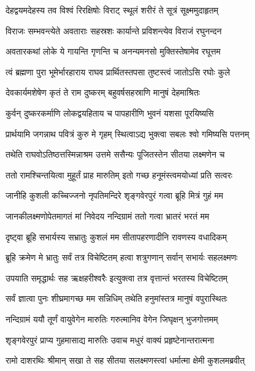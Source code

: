 \twolineshloka
{देहद्वयमदेहस्य तव विश्वं रिरक्षिषोः}
{विराट् स्थूलं शरीरं ते सूत्रं सूक्ष्ममुदाहृतम्} %

\twolineshloka
{विराजः सम्भवन्त्येते अवताराः सहस्रशः}
{कार्यान्ते प्रविशन्त्येव विराजं रघुनन्दन} %

\twolineshloka
{अवतारकथां लोके ये गायन्ति गृणन्ति च}
{अनन्यमनसो मुक्तिस्तेषामेव रघूत्तम} %

\twolineshloka
{त्वं ब्रह्मणा पुरा भूमेर्भारहाराय राघव}
{प्रार्थितस्तपसा तुष्टस्त्वं जातोऽसि रघोः कुले} %

\twolineshloka
{देवकार्यमशेषेण कृतं ते राम दुष्करम्}
{बहुवर्षसहस्राणि मानुषं देहमाश्रितः} %

\twolineshloka
{कुर्वन् दुष्करकर्माणि लोकद्वयहिताय च}
{पापहारीणि भुवनं यशसा पूरयिष्यसि} %

\twolineshloka
{प्रार्थयामि जगन्नाथ पवित्रं कुरु मे गृहम्}
{स्थित्वाऽद्य भुक्त्वा सबलः श्वो गमिष्यसि पत्तनम्} %

\twolineshloka
{तथेति राघवोऽतिष्ठत्तस्मिन्नाश्रम उत्तमे}
{ससैन्यः पूजितस्तेन सीतया लक्ष्मणेन च} %

\twolineshloka
{ततो रामश्चिन्तयित्वा मुहूर्तं प्राह मारुतिम्}
{इतो गच्छ हनूमंस्त्वमयोध्यां प्रति सत्वरः} %

\twolineshloka
{जानीहि कुशली कच्चिज्जनो नृपतिमन्दिरे}
{शृङ्गवेरपुरं गत्वा ब्रूहि मित्रं गुहं मम} %

\twolineshloka
{जानकीलक्ष्मणोपेतमागतं मां निवेदय}
{नन्दिग्रामं ततो गत्वा भ्रातरं भरतं मम} %

\twolineshloka
{दृष्ट्वा ब्रूहि सभार्यस्य सभ्रातुः कुशलं मम}
{सीतापहरणादीनि रावणस्य वधादिकम्} %

\twolineshloka
{ब्रूहि क्रमेण मे भ्रातुः सर्वं तत्र विचेष्टितम्}
{हत्वा शत्रुगणान् सर्वान् सभार्यः सहलक्ष्मणः} %

\twolineshloka
{उपयाति समृद्धार्थः सह ऋक्षहरीश्वरैः}
{इत्युक्त्वा तत्र वृत्तान्तं भरतस्य विचेष्टितम्} %

\twolineshloka
{सर्वं ज्ञात्वा पुनः शीघ्रमागच्छ मम सन्निधिम्}
{तथेति हनुमांस्तत्र मानुषं वपुरास्थितः} %

\twolineshloka
{नन्दिग्रामं ययौ तूर्णं वायुवेगेन मारुतिः}
{गरुत्मानिव वेगेन जिघृक्षन् भुजगोत्तमम्} %

\twolineshloka
{शृङ्गवेरपुरं प्राप्य गुहमासाद्य मारुतिः}
{उवाच मधुरं वाक्यं प्रहृष्टेनान्तरात्मना} %

\twolineshloka
{रामो दाशरथिः श्रीमान् सखा ते सह सीतया}
{सलक्ष्मणस्त्वां धर्मात्मा क्षेमी कुशलमब्रवीत्} %

